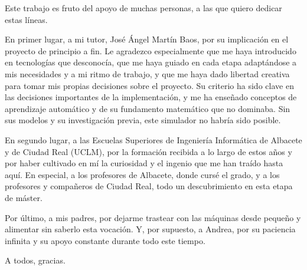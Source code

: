 Este trabajo es fruto del apoyo de muchas personas, a las que quiero dedicar estas líneas.\newline

En primer lugar, a mi tutor, José Ángel Martín Baos, por su implicación en el proyecto de principio a fin. Le agradezco especialmente que me haya introducido en tecnologías que desconocía, que me haya guiado en cada etapa adaptándose a mis necesidades y a mi ritmo de trabajo, y que me haya dado libertad creativa para tomar mis propias decisiones sobre el proyecto. Su criterio ha sido clave en las decisiones importantes de la implementación, y me ha enseñado conceptos de aprendizaje automático y de su fundamento matemático que no dominaba. Sin sus modelos y su investigación previa, este simulador no habría sido posible.\newline

En segundo lugar, a las Escuelas Superiores de Ingeniería Informática de Albacete y de Ciudad Real (UCLM), por la formación recibida a lo largo de estos años y por haber cultivado en mí la curiosidad y el ingenio que me han traído hasta aquí. En especial, a los profesores de Albacete, donde cursé el grado, y a los profesores y compañeros de Ciudad Real, todo un descubrimiento en esta etapa de máster.\newline

Por último, a mis padres, por dejarme trastear con las máquinas desde pequeño y alimentar sin saberlo esta vocación. Y, por supuesto, a Andrea, por su paciencia infinita y su apoyo constante durante todo este tiempo.\newline

A todos, gracias.